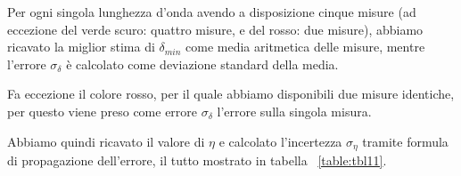 
Per ogni singola lunghezza d'onda avendo a disposizione cinque misure (ad eccezione del verde scuro: quattro misure, e del rosso: due misure), abbiamo ricavato la miglior stima di $\delta_{min}$ come media aritmetica delle misure, mentre l'errore $\sigma_{\delta}$ è calcolato come deviazione standard della media.

Fa eccezione il colore rosso, per il quale abbiamo disponibili due misure identiche, per questo viene preso come errore $\sigma_{\delta}$ l'errore sulla singola misura.

Abbiamo quindi ricavato il valore di $\eta$ e calcolato l'incertezza $\sigma_{\eta}$ tramite formula di propagazione dell'errore, il tutto mostrato in tabella ~\ref{table:tbl11}.

